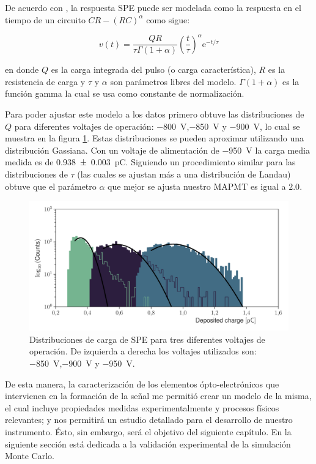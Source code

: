 De acuerdo con \cite{sanchez10}, la respuesta SPE puede ser modelada como la respuesta en el tiempo de un circuito $CR-(RC)^{\alpha}$ como sigue:

\begin{equation}
\label{equ:sphe}
v(t)=\frac{QR}{\tau\Gamma(1+\alpha)}\left(\frac{t}{\tau}\right)^{\alpha}\mathrm{e}^{-t/\tau}
\end{equation}

en donde $Q$ es la carga integrada del pulso (o carga característica), $R$ es la resistencia de carga y
$\tau$ y $\alpha$ son parámetros libres del modelo. $\Gamma(1+\alpha)$ es la función gamma la cual se usa como constante de normalización.

Para poder ajustar este modelo a los datos primero obtuve las distribuciones de $Q$ para diferentes voltajes de operación: \SI{-800}{\volt},\SI{-850}{\volt} y \SI{-900}{\volt}, lo cual se muestra en la figura \ref{fig:mapmt_charge}. Estas distribuciones se pueden aproximar utilizando una distribución Gassiana. Con un voltaje de alimentación de \SI{-950}{\volt} la carga media medida es de \SI{0.938(3)}{\pico\coulomb}. Siguiendo un procedimiento similar para las distribuciones de $\tau$ (las cuales se ajustan más a una distribución de Landau) obtuve que el parámetro $\alpha$ que mejor se ajusta nuestro MAPMT es igual a $2.0$.

\begin{figure}
        \centering
        \includegraphics[width=\textwidth]{mapmt_charge.pdf}
        \caption{Distribuciones de carga de SPE para tres diferentes voltajes de operación. De izquierda a derecha los voltajes utilizados son: \SI{-850}{\volt},\SI{-900}{\volt} y \SI{-950}{\volt}.}
        \label{fig:mapmt_charge}
\end{figure}

De esta manera, la caracterización de los elementos ópto-electrónicos que intervienen en la formación de la señal me permitió crear un modelo de la misma, el cual incluye propiedades medidas experimentalmente y procesos físicos relevantes; y nos permitirá un estudio detallado para el desarrollo de nuestro instrumento. Ésto, sin embargo, será el objetivo del siguiente capítulo. En la siguiente sección está dedicada a la validación experimental de la simulación Monte Carlo.

